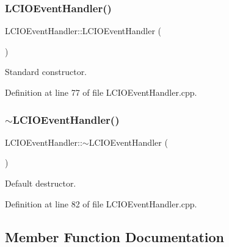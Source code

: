 \subsubsection{\texorpdfstring{L\+C\+I\+O\+Event\+Handler()}{LCIOEventHandler()}}
{\footnotesize\ttfamily L\+C\+I\+O\+Event\+Handler\+::\+L\+C\+I\+O\+Event\+Handler (\begin{DoxyParamCaption}{ }\end{DoxyParamCaption})}



Standard constructor. 



Definition at line 77 of file L\+C\+I\+O\+Event\+Handler.\+cpp.

\hypertarget{class_d_d4hep_1_1_l_c_i_o_event_handler_a26f3acb33ae47d75cee43a2268e5945b}{}\label{class_d_d4hep_1_1_l_c_i_o_event_handler_a26f3acb33ae47d75cee43a2268e5945b} 
\subsubsection{\texorpdfstring{$\sim$\+L\+C\+I\+O\+Event\+Handler()}{~LCIOEventHandler()}}
{\footnotesize\ttfamily L\+C\+I\+O\+Event\+Handler\+::$\sim$\+L\+C\+I\+O\+Event\+Handler (\begin{DoxyParamCaption}{ }\end{DoxyParamCaption})\hspace{0.3cm}{\ttfamily [virtual]}}



Default destructor. 



Definition at line 82 of file L\+C\+I\+O\+Event\+Handler.\+cpp.



\subsection{Member Function Documentation}
\hypertarget{class_d_d4hep_1_1_l_c_i_o_event_handler_adbb8d55fec6962d692f19730fc5224fb}{}\label{class_d_d4hep_1_1_l_c_i_o_event_handler_adbb8d55fec6962d692f19730fc5224fb} 
